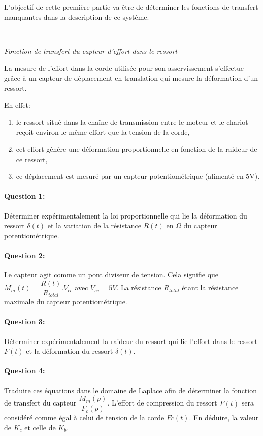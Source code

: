 L'objectif de cette première partie va être de déterminer les fonctions de transfert manquantes dans la description de ce système.

~\

\textit{Fonction de transfert du capteur d'effort dans le ressort}

La mesure de l'effort dans la corde utilisée pour son asservissement s'effectue grâce à un capteur de déplacement en translation qui 
mesure la déformation d'un ressort.

En effet:
\begin{enumerate}
 \item le ressort situé dans la chaîne de transmission entre le moteur et le chariot reçoit environ le même effort que la tension de la corde,
 \item cet effort génère une déformation proportionnelle en fonction de la raideur de ce ressort,
 \item ce déplacement est mesuré par un capteur potentiométrique (alimenté en 5V).
\end{enumerate}

\paragraph{Question 1:} Déterminer expérimentalement la loi proportionnelle qui lie la déformation du ressort $\delta(t)$ et la variation de la résistance $R(t)$ en $\Omega$ du capteur potentiométrique.

\paragraph{Question 2:} Le capteur agit comme un pont diviseur de tension. Cela signifie que $M_m(t)=\dfrac{R(t)}{R_{total}}.V_{cc}$ avec $V_{cc}=5V$. La résistance $R_{total}$ étant la résistance maximale du capteur potentiométrique.

\paragraph{Question 3:} Déterminer expérimentalement la raideur du ressort qui lie l'effort dans le ressort $F(t)$ et la déformation du ressort $\delta(t)$.

\paragraph{Question 4:} Traduire ces équations dans le domaine de Laplace afin de déterminer la fonction de transfert du capteur $\dfrac{M_m(p)}{F_c(p)}$. L'effort de compression du ressort $F(t)$ sera considéré comme égal à celui de tension de la corde $Fc(t)$. En déduire, la valeur de $K_c$ et celle de $K_b$.

